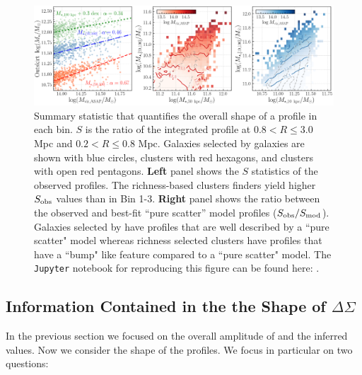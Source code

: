 \documentclass[fleqn,usenatbib,useAMS]{mnras}
\begin{document}
\begin{CJK*}{UTF8}{gbsn}
\begin{figure}
    \centering
    \includegraphics[width=16cm]{figure/fig_11}
    \caption{
        Summary statistic that quantifies the overall shape of a \dsigma{} profile in each \topn{}
        bin. 
        $S$ is the ratio of the integrated \dsigma{} profile at $0.8 < R \leq 3.0$ Mpc and $0.2 < R
        \leq 0.8$ Mpc. 
        Galaxies selected by  galaxies are shown with blue circles, \redm{} clusters
        with red hexagons, and \camira{} clusters with open red pentagons. 
        \textbf{Left} panel shows the $S$ statistics of the observed \dsigma{} profiles.
        The richness-based clusters finders yield higher $S_{\rm obs}$ values than  
        in Bin 1-3.
        \textbf{Right} panel shows the ratio between the observed and best-fit ``pure scatter''
        model \dsigma{} profiles ($S_{\rm obs}/S_{\rm mod}$). 
        Galaxies selected by  have \dsigma{} profiles that are well described by a
        ``pure scatter" model whereas richness selected clusters have \dsigma{} profiles that have a
        ``bump" like feature compared to a ``pure scatter" model.
        The \texttt{Jupyter} notebook for reproducing this figure can be found here:
        \href{https://github.com/dr-guangtou/jianbing/blob/master/notebooks/figure/fig11.ipynb}{\faGithub}.
    }
    \label{fig:dsigma_summary}
\end{figure}

\subsection{Information Contained in the the Shape of \texorpdfstring{$\Delta\Sigma$}{DSigma}}
    \label{sec:mstar_vs_richness}

    In the previous section we focused on the overall amplitude of \dsigma{} and the inferred
    \sigmvir{} values. 
    Now we consider the shape of the \dsigma{} profiles. 
    We focus in particular on two questions:

    \begin{enumerate}


\end{enumerate}
\end{CJK*}
\end{document}
